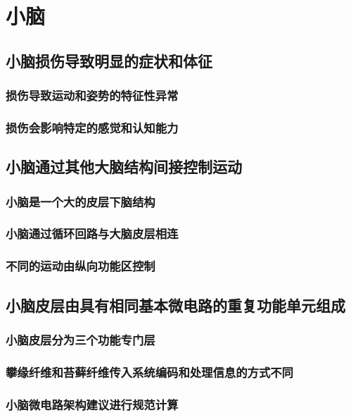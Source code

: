 \chapter{小脑}


\section{小脑损伤导致明显的症状和体征}
\subsection{损伤导致运动和姿势的特征性异常}
\subsection{损伤会影响特定的感觉和认知能力}

\section{小脑通过其他大脑结构间接控制运动}
\subsection{小脑是一个大的皮层下脑结构}
\subsection{小脑通过循环回路与大脑皮层相连}
\subsection{不同的运动由纵向功能区控制}

\section{小脑皮层由具有相同基本微电路的重复功能单元组成}
\subsection{小脑皮层分为三个功能专门层}
\subsection{攀缘纤维和苔藓纤维传入系统编码和处理信息的方式不同}
\subsection{小脑微电路架构建议进行规范计算}

